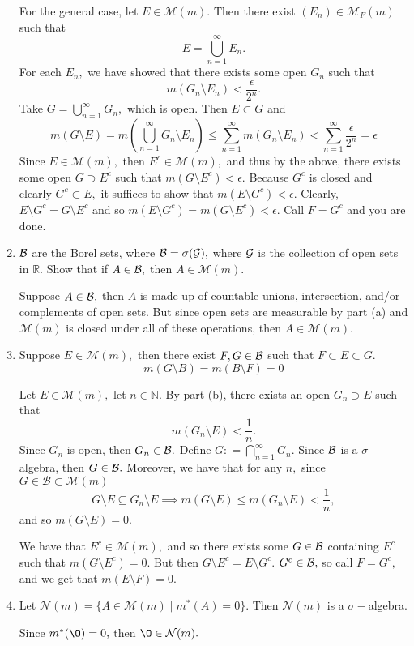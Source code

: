 \documentclass[11pt]{article}
\newcommand{\bbN}{\mathbb{N}}
\newcommand{\bbR}{\mathbb{R}}
\renewcommand{\emptyset}{\O}
\newcommand{\sm}{\setminus}
\begin{document}
\begin{problem}
\begin{enumerate}
\begin{solution}
        For the general case, let $E \in \mathcal{M}(m).$ Then there exist $(E_n) \in \mathcal{M}_F(m)$ such that 
        \[E = \bigcup_{n=1  }^\infty E_n.\] For each $E_n,$ we have showed that there exists some open $G_n$ such that 
        \[m(G_n\sm E_n)<\frac{\epsilon}{2^n}.\] Take $G = \bigcup_{n=1}^\infty G_n,$ which is open. Then $E \subset G$ and
        \[m(G\sm E) = m(\bigcup_{n=1}^\infty G_n\sm E_n) \leq \sum_{n=1}^\infty m (G_n \sm E_n)< \sum_{n=1}^\infty \frac{\epsilon}{2^n}  = \epsilon\]
        Since $E \in \mathcal{M}(m),$ then $E^c \in \mathcal{M}(m),$ and thus by the above, there exists some open $G\supset E^c$ such that $m(G \setminus E^c) < \epsilon.$ Because $G^c$ is closed and clearly $G^c \subset E,$ it suffices to show that $m(E \setminus G^c) < \epsilon.$ Clearly, $E\setminus G^c = G\setminus E^c$ and so $m(E\sm G^c) = m(G \sm E^c) < \epsilon.$ Call $F = G^c$ and you are done.
    \end{solution}
    \item 
    $\cal B$ are the Borel sets, where $\mathcal{B} = \sigma(\cal G),$ where $\cal G$ is the collection of open sets in $\bbR.$ Show that if $A \in \cal B,$ then $A\in \mathcal{M}(m).$
    \begin{solution}
        Suppose $A \in \cal B,$ then $A$ is made up of countable unions, intersection, and/or complements of open sets. But since open sets are measurable by part (a) and $\mathcal{M}(m)$ is closed under all of these operations, then $A \in \mathcal{M}(m).$ 
    \end{solution}
    \item  Suppose $E \in \mathcal{M}(m),$ then there exist $F,G \in \cal B$ such that $F \subset E \subset G.$
    \[m(G\sm B) = m(B\sm F) = 0\]
    \begin{solution}
        Let $E \in \mathcal{M}(m),$ let $n \in \bbN.$ By part (b), there exists an open $G_n\supset E$ such that \[m(G_n \sm E) < \frac{1}{n}.\] Since $G_n$ is open, then $G_n \in \cal B.$ Define $G: = \bigcap_{n=1}^\infty G_n.$ Since $\cal B$ is a $\sigma-$algebra, then $G \in \cal B.$ Moreover, we have that for any $n,$ since $G \in \mathcal{B} \subset \mathcal{M}(m)$
        \[G \sm E \subseteq G_n \sm E \implies m(G \sm E) \leq m(G_n \sm E)< \frac{1}{n},\] and so $m(G \sm E) = 0.$ 

        We have that $E^c \in \mathcal{M}(m),$ and so there exists some $G\in \cal B$ containing $E^c$ such that $m(G\sm E^c) = 0.$ But then $G\sm E^c = E\sm G^c.$ $G^c \in \cal B,$ so call $F = G^c,$ and we get that $m(E \sm F) = 0.$
    \end{solution}
    \item Let $\mathcal{N}(m) = \{A \in \mathcal{M}(m) \mid m^*(A) = 0\}.$ Then $\mathcal{N}(m)$ is a $\sigma-$algebra.
    \begin{solution}
        Since $m^*(\emptyset) = 0,$ then $\emptyset \in \mathcal{N}(m).$


\end{solution}
\end{enumerate}
\end{problem}
\end{document}

